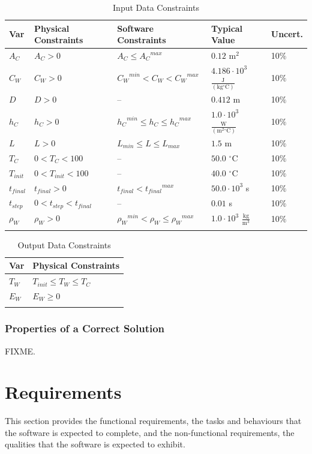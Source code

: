 \documentclass[12pt]{article}
\begin{document}
\begin{longtable}{l l l l l}
\toprule
\textbf{Var} & \textbf{Physical Constraints} & \textbf{Software Constraints} & \textbf{Typical Value} & \textbf{Uncert.}
\\
\midrule
\endhead
${A_{C}}$ & ${A_{C}}>0$ & ${A_{C}}\leq{}{{A_{C}}^{max}}$ & $0.12$ $\text{m}^{2}$ & 10$\%$
\\
${C_{W}}$ & ${C_{W}}>0$ & ${{C_{W}}^{min}}<{C_{W}}<{{C_{W}}^{max}}$ & $4.186\cdot{}10^{3}$ $\frac{\text{J}}{(\text{kg}{}^{\circ}\text{C})}$ & 10$\%$
\\
$D$ & $D>0$ & -- & $0.412$ m & 10$\%$
\\
${h_{C}}$ & ${h_{C}}>0$ & ${{h_{C}}^{min}}\leq{}{h_{C}}\leq{}{{h_{C}}^{max}}$ & $1.0\cdot{}10^{3}$ $\frac{\text{W}}{(\text{m}^{2}{}^{\circ}\text{C})}$ & 10$\%$
\\
$L$ & $L>0$ & ${L_{min}}\leq{}L\leq{}{L_{max}}$ & $1.5$ m & 10$\%$
\\
${T_{C}}$ & $0<{T_{C}}<100$ & -- & $50.0$ ${}^{\circ}$C & 10$\%$
\\
${T_{init}}$ & $0<{T_{init}}<100$ & -- & $40.0$ ${}^{\circ}$C & 10$\%$
\\
${t_{final}}$ & ${t_{final}}>0$ & ${t_{final}}<{{t_{final}}^{max}}$ & $50.0\cdot{}10^{3}$ s & 10$\%$
\\
${t_{step}}$ & $0<{t_{step}}<{t_{final}}$ & -- & $0.01$ s & 10$\%$
\\
${ρ_{W}}$ & ${ρ_{W}}>0$ & ${{ρ_{W}}^{min}}<{ρ_{W}}\leq{}{{ρ_{W}}^{max}}$ & $1.0\cdot{}10^{3}$ $\frac{\text{kg}}{\text{m}^{3}}$ & 10$\%$
\\
\bottomrule
\caption{Input Data Constraints}
\label{Table:InDataConstraints}
\end{longtable}
\begin{longtable}{l l}
\toprule
\textbf{Var} & \textbf{Physical Constraints}
\\
\midrule
\endhead
${T_{W}}$ & ${T_{init}}\leq{}{T_{W}}\leq{}{T_{C}}$
\\
${E_{W}}$ & ${E_{W}}\geq{}0$
\\
\bottomrule
\caption{Output Data Constraints}
\label{Table:OutDataConstraints}
\end{longtable}
\subsubsection{Properties of a Correct Solution}
\label{Sec:CorSolProps}
FIXME.
\section{Requirements}
\label{Sec:Requirements}
This section provides the functional requirements, the tasks and behaviours that the software is expected to complete, and the non-functional requirements, the qualities that the software is expected to exhibit.
\end{document}
